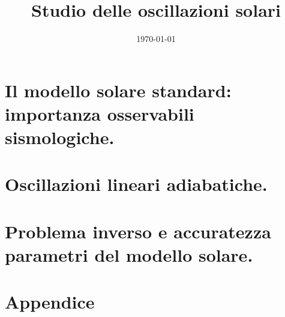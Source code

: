 \documentclass[oneside,11pt,fleqn]{memoir}
\author{ }
\title{Studio delle oscillazioni solari}
\date{\today}
\begin{document}
\frontmatter
{}
\maketitle

\tableofcontents

\clearpage

\thispagestyle{empty}



\clearpage

\mainmatter
{}

\part{Il modello solare standard: importanza osservabili sismologiche.}




\part{Oscillazioni lineari adiabatiche.}



\part{Problema inverso e accuratezza parametri del modello solare.}



\backmatter


\part{Appendice}



\printbibliography
\end{document}
